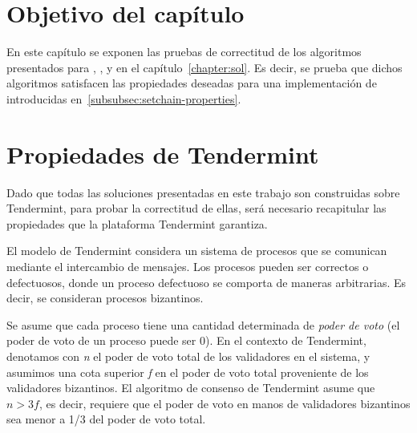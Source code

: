 \section{Objetivo del capítulo}
En este capítulo se exponen las pruebas de correctitud de los algoritmos presentados para
\vanilla, \compresschain, y \hashchain en el capítulo~\ref{chapter:sol}.
Es decir, se prueba que dichos algoritmos satisfacen las propiedades deseadas para una
implementación de \setchain introducidas en~\ref{subsubsec:setchain-properties}.

\section{Propiedades de Tendermint}\label{sec:properties}
Dado que todas las soluciones presentadas en este trabajo son construidas sobre Tendermint,
para probar la correctitud de ellas, será necesario recapitular las propiedades que la
plataforma Tendermint garantiza.

El modelo de Tendermint considera un sistema de procesos que se comunican mediante el intercambio de
mensajes.
Los procesos pueden ser correctos o defectuosos, donde un proceso defectuoso se comporta de maneras
arbitrarias. Es decir, se consideran procesos bizantinos.

Se asume que cada proceso tiene una cantidad determinada de \textit{poder de voto} (el poder de
voto de un proceso puede ser 0).
%
En el contexto de Tendermint, denotamos con \textit{n} el poder de voto total de los validadores
en el sistema, y asumimos una cota superior \textit{f} en el poder de voto total proveniente de
los validadores bizantinos.
%
El algoritmo de consenso de Tendermint asume que $n > 3f$, es decir, requiere que el poder de voto
en manos de validadores bizantinos sea menor a 1/3 del poder de voto total.

